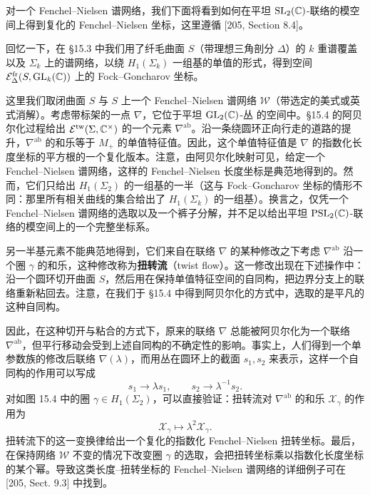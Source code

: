 对一个 Fenchel–Nielsen 谱网络，我们下面将看到如何在平坦 $\operatorname{SL}_2(\mathbb{C})$-联络的模空间上得到复化的 Fenchel–Nielsen 坐标，这里遵循 [205, Section 8.4]。

回忆一下，在 §15.3 中我们用了纤毛曲面 $S$（带理想三角剖分 $\Delta$）的 $k$ 重谱覆盖以及 $\Sigma_k$ 上的谱网络，以绕 $H_1(\Sigma_k)$ 一组基的单值的形式，得到空间 $\mathcal{E}^{\mathrm{fr}}_\Delta(S,\operatorname{GL}_k(\mathbb{C}))$ 上的 Fock–Goncharov 坐标。

这里我们取闭曲面 $S$ 与 $S$ 上一个 Fenchel–Nielsen 谱网络 $\mathcal{W}$（带选定的美式或英式消解）。考虑带标架的一点 $\nabla$，它位于平坦 $\operatorname{GL}_2(\mathbb{C})$-丛%
的空间中。§15.4 的阿贝尔化过程给出 $\mathcal{E}^{\mathrm{tw}}(\Sigma,\mathbb{C}^\times)$ 的一个元素 $\nabla^{\mathrm{ab}}$。沿一条绕圆环正向行走的道路的提升，$\nabla^{\mathrm{ab}}$ 的和乐等于 $M_+$ 的单值特征值。因此，这个单值特征值是 $\nabla$ 的指数化长度坐标的平方根的一个复化版本。注意，由阿贝尔化映射可见，给定一个 Fenchel–Nielsen 谱网络，这样的 Fenchel–Nielsen 长度坐标是典范地得到的。然而，它们只给出 $H_1(\Sigma_2)$ 的一组基的一半（这与 Fock–Goncharov 坐标的情形不同：那里所有相关曲线的集合给出了 $H_1(\Sigma_k)$ 的一组基）。换言之，仅凭一个 Fenchel–Nielsen 谱网络的选取以及一个裤子分解，并不足以给出平坦 $\operatorname{PSL}_2(\mathbb{C})$-联络的模空间上的一个完整坐标系。

另一半基元素不能典范地得到，它们来自在联络 $\nabla$ 的某种修改之下考虑 $\nabla^{\mathrm{ab}}$ 沿一个圈 $\gamma$ 的和乐，这种修改称为\textbf{扭转流}（twist flow）。这一修改出现在下述操作中：沿一个圆环切开曲面 $S$，然后用在保持单值特征空间的自同构，把边界分支上的联络重新粘回去。注意，在我们于 §15.4 中得到阿贝尔化的方式中，选取的是平凡的这种自同构。

因此，在这种切开与粘合的方式下，原来的联络 $\nabla$ 总能被阿贝尔化为一个联络 $\nabla^{\mathrm{ab}}$，但平行移动会受到上述自同构的不确定性的影响。事实上，人们得到一个单参数族的修改后联络 $\nabla(\lambda)$，而用丛在圆环上的截面 $s_1,s_2$ 来表示，这样一个自同构的作用可以写成
\[
s_1\to\lambda s_1,\qquad s_2\to\lambda^{-1}s_2 .
\]
对如图 15.4 中的圈 $\gamma\in H_1(\Sigma_2)$，可以直接验证：扭转流对 $\nabla^{\mathrm{ab}}$ 的和乐 $\mathcal{X}_\gamma$ 的作用为
\[
\mathcal{X}_\gamma\mapsto\lambda^2\mathcal{X}_\gamma .
\]
扭转流下的这一变换律给出一个复化的指数化 Fenchel–Nielsen 扭转坐标。最后，在保持网络 $\mathcal{W}$ 不变的情况下改变圈 $\gamma$ 的选取，会把扭转坐标乘以指数化长度坐标的某个幂。导致这类长度–扭转坐标的 Fenchel–Nielsen 谱网络的详细例子可在 [205, Sect. 9.3] 中找到。

